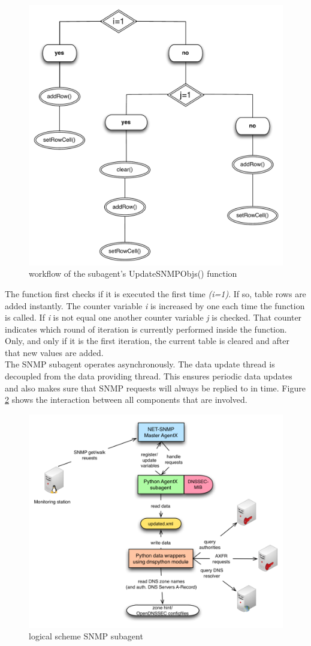 \begin{figure}[H]
\centering
\includegraphics[scale=0.5]{Images/workflow.pdf}
\caption{workflow of the subagent's UpdateSNMPObjs() function}
\label{figure:workflow}
\end{figure}

The function first checks if it is executed the first time \textit{(i=1)}. If so, table rows are added instantly. The counter variable \textit{i} is increased by one each time the function is called. If \textit{i} is not equal one  another counter variable \textit{j} is checked. That counter indicates which round of iteration is currently performed inside the function. Only, and only if it is the first iteration, the current table is cleared and after that new values are added.
\\
The SNMP subagent operates asynchronously. The data update thread is decoupled from the data providing thread. This ensures periodic data updates and also makes sure that SNMP requests will always be replied to in time. Figure \ref{figure:subagent} shows the interaction between all components that are involved.

\begin{figure}[H]
\centering
\includegraphics[scale=0.7]{Images/topology3.pdf}
\caption{logical scheme SNMP subagent}
\label{figure:subagent}
\end{figure}
 
